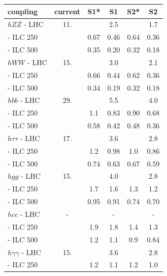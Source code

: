 \begin{table}[!htbp]
\begin{center}
\begin{tabular}{lccccc}
   coupling     &  current  &    S1*     &     S1     &    S2*   &   S2   \\ \hline 
$hZZ$ - LHC  &     11.      &        &       2.5   &        &  1.7 \\ 
\phantom{$hZZ$} - ILC 250 &      &   0.67  &  0.46   &   0.64   &  0.36 \\ 
\phantom{$hZZ$} - ILC 500&      &   0.35  &  0.20  &  0.32   & 0.18 \\ 
 \hline 
$hWW$ - LHC  &    15.       &        &    3.0     &        &  2.1 \\ 
\phantom{$hWW$} - ILC 250 &      &   0.66 &  0.44   &   0.62  &  0.36 \\ 
 \phantom{$hWW$} - ILC 500 &      &   0.34 &  0.19   &  0.32 & 0.18 \\ 
   \hline 
$hbb$ - LHC  &    29.       &        &          5.5   &        & 4.0 \\ 
\phantom{$hbb$} - ILC 250 &      &  1.1  & 0.83   &   0.90   &  0.68 \\ 
\phantom{$hbb$} - ILC 500 &      &  0.58  & 0.42   &  0.48  &  0.36 \\ 
 \hline 
$h\tau\tau$ - LHC  &    17.       &        &              3.6  &        & 2.8 \\ 
\phantom{$h\tau\tau$} - ILC 250 &      &  1.2  &  0.98   &   1.0  &  0.86 \\ 
\phantom{$h\tau\tau$} - ILC 500 &      &  0.74  &  0.63   &  0.67   & 0.59 \\ 
    \hline 
$hgg$ - LHC  &     15.      &        &            4.0   &        &
                2.8   \\ 
\phantom{$hgg$} - ILC 250 &      &  1.7  &  1.6   &   1.3   &  1.2 \\ 
 \phantom{$hgg$} - ILC 500 &      &  0.95  &  0.91   &  0.74  & 0.70 \\ 
\hline 
$hcc$ - LHC  &    -       &        &           -  &        &  - \\ 
\phantom{$hcc$} - ILC 250 &      &   1.9  &  1.8   &   1.4  &  1.3 \\ 
\phantom{$hcc$} - ILC 500 &      &  1.2  &  1.1   &   0.9  &  0.84 \\ 
    \hline 
$h\gamma\gamma$ - LHC  &    15.       &        &         3.6  &        & 2.8 \\ 
\phantom{$h\gamma\gamma$} - ILC 250  &      &   1.2  &  1.1  &   1.2   &  1.0\\ 

\end{tabular}
\end{center}
\end{table}
